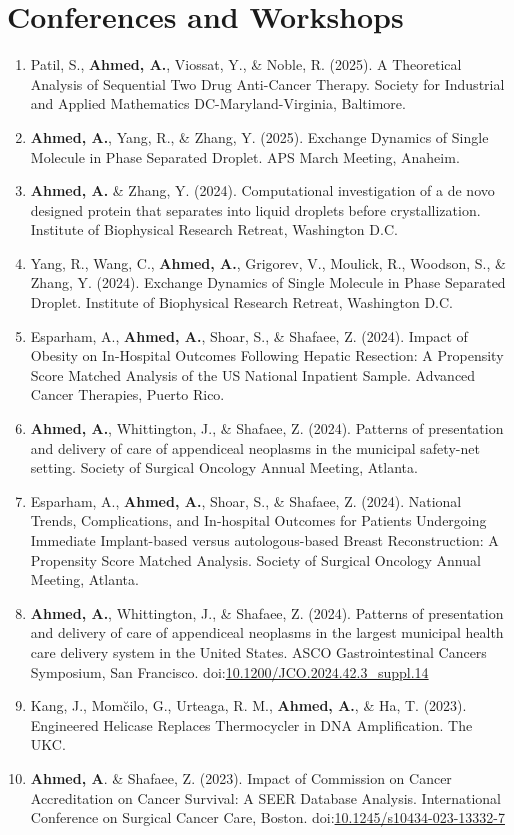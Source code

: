 \documentclass[letterpaper,11pt]{article}
\newcommand{\resumeItem}[2]{
  \item\small{
    \textbf{#1}{#2 \vspace{-2pt}}
  }
}
\newcommand{\resumeSubItem}[2]{\resumeItem{#1}{#2}\vspace{-4pt}}
\begin{document}
\section{Conferences and Workshops}
  \begin{enumerate}[leftmargin=*]
  \resumeSubItem{}
    {Patil, S., \textbf{Ahmed, A.}, Viossat, Y., \& Noble, R. (2025). A Theoretical Analysis of Sequential Two Drug Anti-Cancer Therapy. Society for Industrial and Applied Mathematics DC-Maryland-Virginia, Baltimore.}
  \resumeSubItem{}
    {\textbf{Ahmed, A.}, Yang, R., \& Zhang, Y. (2025). Exchange Dynamics of Single Molecule in Phase Separated Droplet. APS March Meeting, Anaheim.}
  \resumeSubItem{}
    {\textbf{Ahmed, A.} \& Zhang, Y. (2024). Computational investigation of a de novo designed protein that separates into liquid droplets before crystallization. Institute of Biophysical Research Retreat, Washington D.C.}
  \resumeSubItem{}
    {Yang, R., Wang, C., \textbf{Ahmed, A.}, Grigorev, V., Moulick, R., Woodson, S., \& Zhang, Y. (2024). Exchange Dynamics of Single Molecule in Phase Separated Droplet. Institute of Biophysical Research Retreat, Washington D.C.}
  \resumeSubItem{}
    {Esparham, A., \textbf{Ahmed, A.}, Shoar, S., \& Shafaee, Z. (2024). Impact of Obesity on In-Hospital Outcomes Following Hepatic Resection: A Propensity Score Matched Analysis of the US National Inpatient Sample. Advanced Cancer Therapies, Puerto Rico.}
  \resumeSubItem{}
    {\textbf{Ahmed, A.}, Whittington, J., \& Shafaee, Z. (2024). Patterns of presentation and delivery of care of appendiceal neoplasms in the municipal safety-net setting. Society of Surgical Oncology Annual Meeting, Atlanta.}
  \resumeSubItem{}
    {Esparham, A., \textbf{Ahmed, A.}, Shoar, S., \& Shafaee, Z. (2024). National Trends, Complications, and In-hospital Outcomes for Patients Undergoing Immediate Implant-based versus autologous-based Breast Reconstruction: A Propensity Score Matched Analysis. Society of Surgical Oncology Annual Meeting, Atlanta.}
  \resumeSubItem{}
    {\textbf{Ahmed, A.}, Whittington, J., \& Shafaee, Z. (2024). Patterns of presentation and delivery of care of appendiceal neoplasms in the largest municipal health care delivery system in the United States. ASCO Gastrointestinal Cancers Symposium, San Francisco. doi:\href{https://doi.org/10.1200/JCO.2024.42.3_suppl.14}{10.1200/JCO.2024.42.3\_suppl.14}}
  \resumeSubItem{}
    {Kang, J., Mom\u cilo, G., Urteaga, R. M., \textbf{Ahmed, A.}, \& Ha, T. (2023). Engineered Helicase Replaces Thermocycler in DNA Amplification. The UKC.}
  \resumeSubItem{}
    {\textbf{Ahmed, A}. \& Shafaee, Z. (2023). Impact of Commission on Cancer Accreditation on Cancer Survival: A SEER Database Analysis. International Conference on Surgical Cancer Care, Boston. doi:\href{https://doi.org/10.1245/s10434-023-13332-7}{10.1245/s10434-023-13332-7}}
  \end{enumerate}
\end{document}
